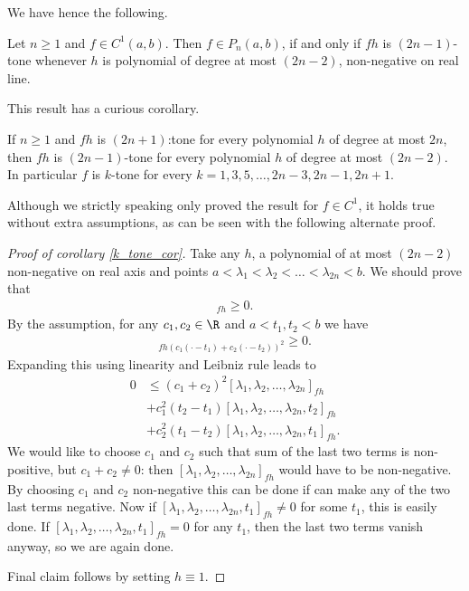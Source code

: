We have hence the following.

\begin{lause}
	Let $n \geq 1$ and $f \in C^{1}(a, b)$. Then $f \in P_{n}(a, b)$, if and only if $f h$ is $(2 n - 1)$-tone whenever $h$ is polynomial of degree at most $(2 n - 2)$, non-negative on real line. 
\end{lause}

This result has a curious corollary.

\begin{kor}\label{k_tone_cor}
	If $n \geq 1$ and $f h$ is $(2 n + 1)$:tone for every polynomial $h$ of degree at most $2 n$, then $f h$ is $(2 n - 1)$-tone for every polynomial $h$ of degree at most $(2 n - 2)$. In particular $f$ is $k$-tone for every $k = 1, 3, 5, \ldots, 2n - 3, 2 n - 1, 2n + 1$.
\end{kor}
Although we strictly speaking only proved the result for $f \in C^{1}$, it holds true without extra assumptions, as can be seen with the following alternate proof.

\begin{proof}[Proof of corollary \ref{k_tone_cor}]
	Take any $h$, a polynomial of at most $(2 n - 2)$ non-negative on real axis and points $a < \lambda_{1} < \lambda_{2} < \ldots < \lambda_{2 n} < b$. We should prove that
	\begin{align*}
		[\lambda_{1}, \lambda_{2}, \ldots, \lambda_{2 n}]_{f h} \geq 0.
	\end{align*}
	By the assumption, for any $c_{1}, c_{2} \in \R$ and $a < t_{1}, t_{2} < b$ we have
	\begin{align*}
		[\lambda_{1}, \lambda_{2}, \ldots, \lambda_{2 n}, t_{1}, t_{2}]_{f h (c_{1} (\cdot - t_{1}) + c_{2} (\cdot - t_{2}))^2} \geq 0.
	\end{align*}
	Expanding this using linearity and Leibniz rule leads to
	\begin{align*}
		0 &\leq (c_{1} + c_{2})^{2} [\lambda_{1}, \lambda_{2}, \ldots, \lambda_{2 n}]_{f h} \\
		&+ c_{1}^2 (t_{2} - t_{1}) [\lambda_{1}, \lambda_{2}, \ldots, \lambda_{2 n}, t_{2}]_{f h} \\
		&+ c_{2}^2 (t_{1} - t_{2}) [\lambda_{1}, \lambda_{2}, \ldots, \lambda_{2 n}, t_{1}]_{f h}.
	\end{align*}
	We would like to choose $c_{1}$ and $c_{2}$ such that sum of the last two terms is non-positive, but $c_{1} + c_{2} \neq 0$: then $[\lambda_{1}, \lambda_{2}, \ldots, \lambda_{2 n}]_{f h}$ would have to be non-negative. By choosing $c_{1}$ and $c_{2}$ non-negative this can be done if can make any of the two last terms negative. Now if $[\lambda_{1}, \lambda_{2}, \ldots, \lambda_{2 n}, t_{1}]_{f h} \neq 0$ for some $t_{1}$, this is easily done. If $[\lambda_{1}, \lambda_{2}, \ldots, \lambda_{2 n}, t_{1}]_{f h} = 0$ for any $t_{1}$, then the last two terms vanish anyway, so we are again done.

	Final claim follows by setting $h \equiv 1$.
\end{proof}

